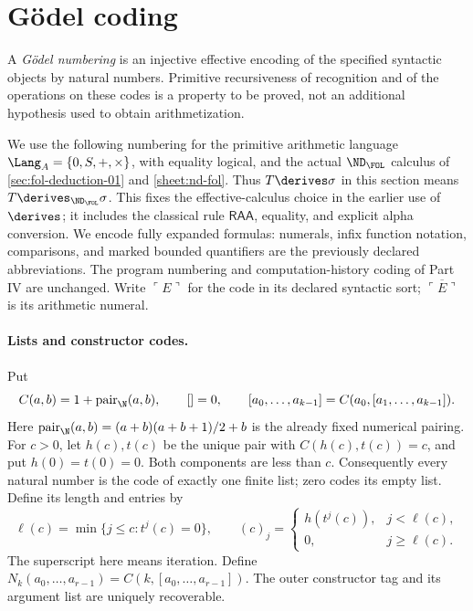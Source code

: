 \section{G\"odel coding}
\label{sec:arithmetic-coding-04}

\begin{definition}
A \emph{G\"odel numbering} is an injective effective encoding of the
specified syntactic objects by natural numbers.  Primitive recursiveness of
recognition and of the operations on these codes is a property to be proved,
not an additional hypothesis used to obtain arithmetization.
\end{definition}

We use the following numbering for the primitive arithmetic language
\(\Lang_A=\{0,S,+,\times\}\), with equality logical, and the actual
\(\ND_{\FOL}\) calculus of \cref{sec:fol-deduction-01} and
\cref{sheet:nd-fol}.  Thus \(T\derives\sigma\) in this section means
\(T\derives_{\ND_{\FOL}}\sigma\).  This fixes the effective-calculus
choice in the earlier use of \(\derives\); it includes the classical rule
\(\mathsf{RAA}\), equality, and explicit alpha conversion.  We encode
fully expanded formulas: numerals, infix function notation, comparisons,
and marked bounded quantifiers are the previously declared abbreviations.
The program numbering and computation-history coding of Part IV are unchanged.
Write \(\ulcorner E\urcorner\) for the code in its declared syntactic
sort; \(\overline{\ulcorner E\urcorner}\) is its arithmetic numeral.

\paragraph{Lists and constructor codes.}
Put
\[
 C(a,b)=1+\operatorname{pair}_{\N}(a,b),\qquad
 []=0,\qquad [a_0,\ldots,a_{k-1}]=C(a_0,[a_1,\ldots,a_{k-1}]).
\]
Here \(\operatorname{pair}_{\N}(a,b)=(a+b)(a+b+1)/2+b\) is the
already fixed numerical pairing.  For \(c>0\), let \(h(c),t(c)\)
be the unique pair with \(C(h(c),t(c))=c\), and put
\(h(0)=t(0)=0\).  Both components are less than \(c\).
Consequently every natural number is the code of exactly one finite list;
zero codes its empty list.  Define its length and entries by
\[
 \ell(c)=\min\{j\le c:t^j(c)=0\},\qquad
 (c)_j=\begin{cases}h(t^j(c)),&j<\ell(c),\\0,&j\ge\ell(c).
 \end{cases}
\]
The superscript here means iteration.  Define
\(N_k(a_0,\ldots,a_{r-1})=C(k,[a_0,\ldots,a_{r-1}])\).
The outer constructor tag and its argument list are uniquely recoverable.

